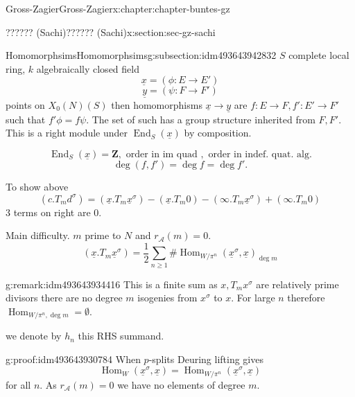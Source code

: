 \documentclass[oneside,10pt,]{book}
\numberwithin{equation}{section}
\newcommand{\ZZ}{\mathbf{Z}}
\DeclareMathOperator{\End}{End}
\DeclareMathOperator{\Hom}{Hom}
\begin{document}
\begin{chapterptx}{Gross-Zagier}{}{Gross-Zagier}{}{}{x:chapter:chapter-buntes-gz}
\begin{sectionptx}{?????? (Sachi)}{}{?????? (Sachi)}{}{}{x:section:sec-gz-sachi}
\begin{subsectionptx}{Homomorphsims}{}{Homomorphsims}{}{}{g:subsection:idm493643942832}
\(S\) complete local ring, \(k\) algebraically closed field%
\begin{equation*}
\underline x = (\phi  \colon E \to E')
\end{equation*}
%
\begin{equation*}
\underline y = (\psi  \colon F \to F')
\end{equation*}
points on \(X_0(N)(S)\) then homomorphisms \(\underline x \to \underline y\) are \(f\colon E\to F, f'\colon E'\to F'\) such that \(f' \phi = f \psi\). The set of such has a group structure inherited from \(F,F'\). This is a right module under \(\End_S(\underline x)\) by composition.%
\par
%
\begin{equation*}
\End_S(\underline x) = \ZZ, \text{ order in im quad }, \text{ order in indef. quat. alg.}
\end{equation*}
%
\begin{equation*}
\deg(f,f') = \deg f = \deg f'\text{.}
\end{equation*}
%
\par
To show above%
\begin{equation*}
(c.T_m d^\sigma ) = (\underline x. T_m \underline x^\sigma ) - (\underline x . T_m 0) - (\infty .T_m \underline x^\sigma ) + (\infty .T_m 0)
\end{equation*}
3 terms on right are 0.%
\par
Main difficulty. \(m\) prime to \(N\) and \(r_{\mathcal A} (m) = 0\).%
\begin{equation*}
(\underline x. T_m \underline x ^\sigma ) = \frac 12 \sum_{n\ge 1} \# \Hom _{W/\pi ^n}(\underline x ^\sigma , \underline x)_{\deg m}
\end{equation*}
%
\begin{remark}{}{g:remark:idm493643934416}%
This is a finite sum as \(x, T_mx^\sigma \) are relatively prime divisors there are no degree \(m\) isogenies from \(x^\sigma \) to \(x\). For large \(n\) therefore \(\Hom_{W/\pi ^n,\deg m} = \emptyset\).%
\end{remark}
we denote by \(h_n\) this RHS summand.%
\begin{proofptx}{}{g:proof:idm493643930784}
When \(p\)-splits Deuring lifting gives%
\begin{equation*}
\Hom_W (\underline x^\sigma ,\underline x) = \Hom_{W/\pi ^n}(\underline x^\sigma , \underline x)
\end{equation*}
for all \(n\). As \(r_{\mathcal A}(m)= 0\) we have no elements of degree \(m\).%
\par

\end{proofptx}
\end{subsectionptx}
\end{sectionptx}
\end{chapterptx}
\end{document}
